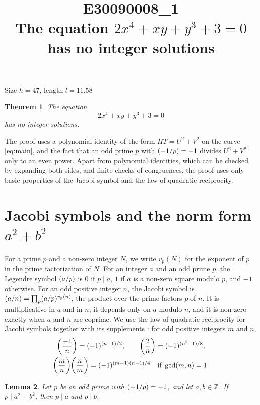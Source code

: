 \documentclass[11pt]{article}
\title{\textbf{E30090008\_1}\\[4pt] {\Large The equation $2x^{4}+xy+y^{3}+3=0$ has no integer solutions}}
\author{}
\date{}
\newtheorem{theorem}{Theorem}
\newtheorem{lemma}[theorem]{Lemma}
\newcommand{\Z}{\mathbb{Z}}
\newcommand{\leg}[2]{\mathchoice{\biggl(\dfrac{#1}{#2}\biggr)}{(#1/#2)}{(#1/#2)}{(#1/#2)}}
\begin{document}
\maketitle
\vspace{-8ex}
\begin{center}
Size $h=47$, length $l=11.58$
\end{center}

\begin{theorem}\label{thm:main}
The equation
\begin{equation}\label{eq:main}
2x^{4}+xy+y^{3}+3=0
\end{equation}
has no integer solutions.
\end{theorem}

The proof uses a polynomial identity of the form $HT=U^2+V^2$ on the curve \eqref{eq:main}, and the fact that an odd prime $p$ with $\leg{-1}{p}=-1$ divides $U^2+V^2$ only to an even power. Apart from polynomial identities, which can be checked by expanding both sides, and finite checks of congruences, the proof uses only basic properties of the Jacobi symbol and the law of quadratic reciprocity.

\section{\texorpdfstring{Jacobi symbols and the norm form $a^2+b^2$}{Jacobi symbols and the norm form}}

For a prime $p$ and a non-zero integer $N$, we write $v_p(N)$ for the exponent of $p$ in the prime factorization of $N$. For an integer $a$ and an odd prime $p$, the Legendre symbol $\leg{a}{p}$ is $0$ if $p\mid a$, $1$ if $a$ is a non-zero square modulo $p$, and $-1$ otherwise. For an odd positive integer $n$, the Jacobi symbol is $\leg{a}{n}=\prod_p\leg{a}{p}^{v_p(n)}$, the product over the prime factors $p$ of $n$. It is multiplicative in $a$ and in $n$, it depends only on $a$ modulo $n$, and it is non-zero exactly when $a$ and $n$ are coprime. We use the law of quadratic reciprocity for Jacobi symbols together with its supplements \cite[Chapter~5, \S2]{IR}: for odd positive integers $m$ and $n$,
\begin{gather*}
\leg{-1}{n}=(-1)^{(n-1)/2},\qquad\leg{2}{n}=(-1)^{(n^2-1)/8},\\
\leg{m}{n}\leg{n}{m}=(-1)^{(m-1)(n-1)/4}\quad\text{if }\gcd(m,n)=1.
\end{gather*}

\begin{lemma}\label{lem:divides}
Let $p$ be an odd prime with $\leg{-1}{p}=-1$, and let $a,b\in\Z$. If $p\mid a^2+b^2$, then $p\mid a$ and $p\mid b$.
\end{lemma}
\end{document}
